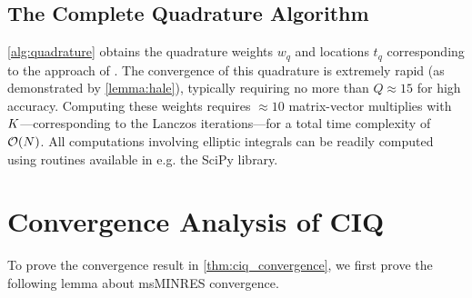 \subsection{The Complete Quadrature Algorithm}
\cref{alg:quadrature} obtains the quadrature weights $w_q$ and locations $t_q$ corresponding to the approach of \citet{hale2008computing}.
The convergence of this quadrature is extremely rapid (as demonstrated by \cref{lemma:hale}), typically requiring no more than $Q \approx 15$ for high accuracy.
Computing these weights requires $\approx 10$ matrix-vector multiplies with $K$---corresponding to the Lanczos iterations---for a total time complexity of $\bigo{N}$.
All computations involving elliptic integrals can be readily computed using routines available in e.g. the SciPy library.



\section{Convergence Analysis of CIQ}

To prove the convergence result in \cref{thm:ciq_convergence}, we first prove the following lemma about msMINRES convergence.

